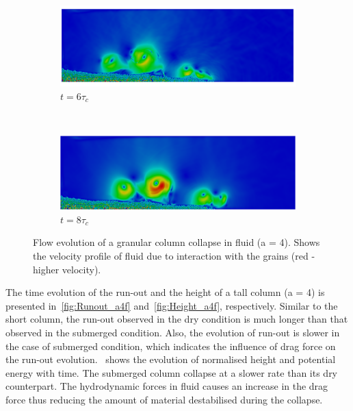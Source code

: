 \begin{figure}
\ContinuedFloat
\begin{subfigure}[b]{0.975\textwidth}
	\centering
    \includegraphics[width=\textwidth]{a4/a4_6tc}
    \caption*{$t = 6\tau_c$}
    \label{fig:a4_6tc}
\end{subfigure}
\\
\begin{subfigure}[b]{0.975\textwidth}
	\centering
    \includegraphics[width=\textwidth]{a4/a4_8tc}
    \caption*{$t = 8\tau_c$}
    \label{fig:a4_8tc}
\end{subfigure}

\caption[Flow evolution of a granular column collapse in fluid (a = 4)]{Flow 
evolution of a granular column collapse in fluid (a = 4). Shows 
the velocity profile of fluid due to interaction with the grains (red - higher 
velocity).}
\label{fig:a4_snapshots}
\end{figure}

The time evolution of the run-out and the height of a tall column (a = 4) is 
presented in~\cref{fig:Runout_a4f} and~\cref{fig:Height_a4f}, respectively. 
Similar to the short column, the run-out observed in the dry condition is much 
longer than that observed in the submerged condition. Also, the evolution of 
run-out is slower in the case of submerged condition, which indicates the 
influence of drag force on the run-out 
evolution.~ shows the evolution of normalised 
height and potential energy with time. The submerged column collapse at a 
slower rate than its dry counterpart. The hydrodynamic forces in fluid causes 
an increase in the drag force thus reducing the amount of 
material destabilised during the collapse.

